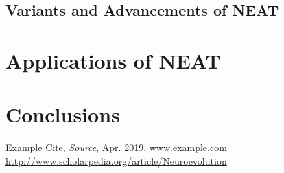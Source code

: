 \documentclass[journal, a4paper]{IEEEtran}
\begin{document}
\subsection{Variants and Advancements of NEAT}




\section{Applications of NEAT}




\section{Conclusions}

\blindtext




\begin{thebibliography}{5}

    Example Cite, {\em Source}, Apr. 2019.
    \url{www.example.com}
    \url{http://www.scholarpedia.org/article/Neuroevolution}

\end{thebibliography}
\end{document}
